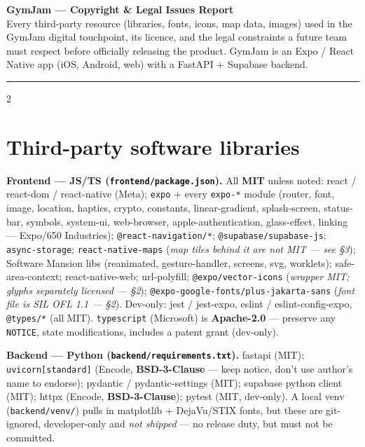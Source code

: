 \documentclass[a4paper,8pt]{extarticle}
\newcommand{\lic}[1]{\textbf{#1}}
\begin{document}
\footnotesize

\begin{center}
{\large\bfseries GymJam --- Copyright \& Legal Issues Report}\\[1pt]
{\scriptsize Every third-party resource (libraries, fonts, icons, map data, images) used in the GymJam digital touchpoint, its licence, and the
legal constraints a future team must respect before officially releasing the product. GymJam is an Expo / React Native app (iOS, Android, web) with a FastAPI + Supabase backend.}
\end{center}
\vspace{-2pt}
\hrule
\vspace{2pt}

\begin{multicols}{2}

\section{Third-party software libraries}

\textbf{Frontend --- JS/TS (\texttt{frontend/package.json}).} All \lic{MIT} unless noted:
react / react-dom / react-native (Meta); \texttt{expo} + every \texttt{expo-*} module (router, font, image, location, haptics, crypto, constants, linear-gradient, splash-screen, status-bar, symbols, system-ui, web-browser, apple-authentication, glass-effect, linking --- Expo/650 Industries);
\texttt{@react-navigation/*}; \texttt{@supabase/supabase-js}; \texttt{async-storage};
\texttt{react-native-maps} (\emph{map tiles behind it are not MIT --- see \S3});
Software Mansion libs (reanimated, gesture-handler, screens, svg, worklets);
safe-area-context; react-native-web; url-polyfill;
\texttt{@expo/vector-icons} (\emph{wrapper MIT; glyphs separately licensed --- \S2});
\texttt{@expo-google-fonts/plus-jakarta-sans} (\emph{font file is SIL OFL 1.1 --- \S2}).
Dev-only: jest / jest-expo, eslint / eslint-config-expo, \texttt{@types/*} (all MIT).
\texttt{typescript} (Microsoft) is \lic{Apache-2.0} --- preserve any \texttt{NOTICE}, state modifications, includes a patent grant (dev-only).

\smallskip
\textbf{Backend --- Python (\texttt{backend/requirements.txt}).}
fastapi (MIT); \texttt{uvicorn[standard]} (Encode, \lic{BSD-3-Clause} --- keep notice, don't use author's name to endorse); pydantic / pydantic-settings (MIT); supabase python client (MIT); httpx (Encode, \lic{BSD-3-Clause}); pytest (MIT, dev-only).
A local venv (\texttt{backend/venv/}) pulls in matplotlib + DejaVu/STIX fonts, but these are git-ignored, developer-only and \emph{not shipped} --- no release duty, but must not be committed.


\end{multicols}
\end{document}
